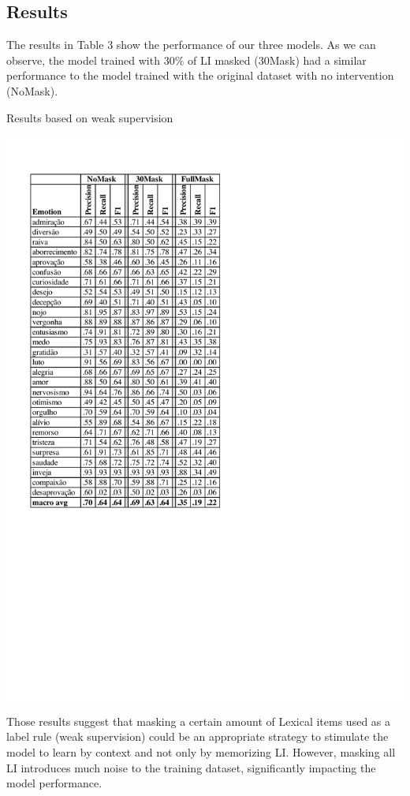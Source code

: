 \documentclass[12pt]{article}
\begin{document}
\subsection{Results}


The results in Table 3 show the performance of our three models. As we can observe, the model trained with 30\% of LI masked (30Mask) had a similar performance to the model trained with the original dataset with no intervention (NoMask).

\begin{table}[ht]
  \label{fig:results}
  \caption{Results based on weak supervision}
  \centering
  \includegraphics[trim=0.2cm 9.8cm 9.6cm 1.5cm, clip, scale=0.7]{img-n-tables/resultados.pdf}
\end{table}


Those results suggest that masking a certain amount of Lexical items used as a label rule (weak supervision) could be an appropriate strategy to stimulate the model to learn by context and not only by memorizing LI. However, masking all LI introduces much noise to the training dataset, significantly impacting the model performance. 
\end{document}
